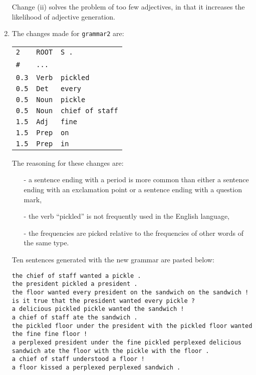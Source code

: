 \documentclass[11pt]{article}
\newcommand{\code}[1]{\texttt{#1}}
\begin{document}
\begin{enumerate}
	Change (ii) solves the problem of too few adjectives, in that it increases the likelihood of adjective generation.
\item
	The changes made for \code{grammar2} are:
	\begin{center} \begin{tabular}{l l l}
	\code{2}    & \code{ROOT} & \code{S .} \\
	\code{\#}    & \code {...} & \ \\
	\code{0.3} & \code{Verb} & \code{pickled} \\
	\code{0.5} & \code{Det} & \code{every} \\
	\code{0.5} & \code{Noun} & \code{pickle} \\
	\code{0.5} & \code{Noun} & \code{chief of staff} \\
	\code{1.5} & \code{Adj} & \code{fine} \\
	\code{1.5} & \code{Prep} & \code{on} \\
	\code{1.5} & \code{Prep} & \code{in} 
	\end{tabular} \end{center}
	
	The reasoning for these changes are:
        \begin{itemize}
        \item[-] a sentence ending with a period is more common than either a sentence ending with an exclamation point or a sentence ending with a question mark,
        \item[-] the verb ``pickled'' is not frequently used in the English language,
        \item[-] the frequencies are picked relative to the frequencies of other words of the same type.
        \end{itemize}
        
        Ten sentences generated with the new grammar are pasted below:
        \begin{lstlisting}
the chief of staff wanted a pickle .
the president pickled a president .
the floor wanted every president on the sandwich on the sandwich !
is it true that the president wanted every pickle ?
a delicious pickled pickle wanted the sandwich !
a chief of staff ate the sandwich .
the pickled floor under the president with the pickled floor wanted the fine fine floor !
a perplexed president under the fine pickled perplexed delicious sandwich ate the floor with the pickle with the floor .
a chief of staff understood a floor !
a floor kissed a perplexed perplexed sandwich .
        \end{lstlisting}
	
\end{enumerate}
\end{document}
